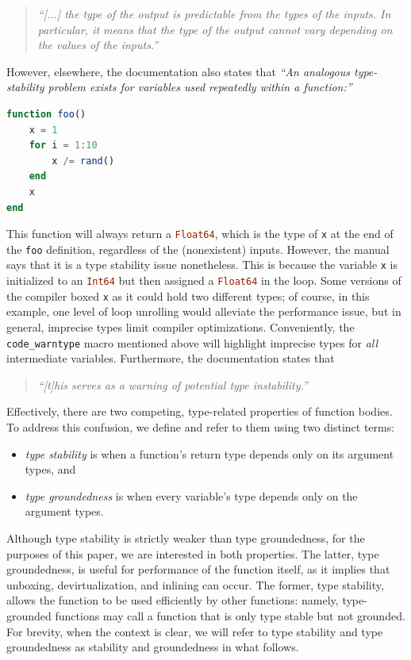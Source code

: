 \documentclass[oneside,openright,titlepage,numbers=noenddot,%
headinclude,footinclude,cleardoublepage=empty,abstract=on,
BCOR=5mm,paper=a4,fontsize=11pt,
dvipsnames
]{scrreprt}
\renewcommand{\c}[1]{\lstinline[language=Julia]!#1!\xspace}
\begin{document}
\begin{quote}
  \itshape``[...] the type of the output is predictable from the types of the
  inputs. In particular, it means that the type of the output cannot vary
  depending on the values of the inputs.''
\end{quote}
However, elsewhere, the documentation also states that \emph{``An analogous
type-stability problem exists for variables used repeatedly within a
function:''}
\begin{lstlisting}[basicstyle=\footnotesize\ttfamily,language=julia]
function foo()
    x = 1
    for i = 1:10
        x /= rand()
    end
    x
end
\end{lstlisting}
This function will always return a \c{Float64}, which is the type of \c{x}
at the end of the \c{foo} definition, regardless of the (nonexistent)
inputs. However, the manual says that it is a type stability issue nonetheless.
This is because the variable \c{x} is initialized to an \c{Int64} but then
assigned a \c{Float64} in the loop. Some versions of the compiler boxed \c{x} as
it could hold two different types; of course, in this example, one level of loop
unrolling would alleviate the performance issue, but in general,
imprecise types limit compiler optimizations.
Conveniently, the \c{code_warntype} macro mentioned above
will highlight imprecise types for \emph{all} intermediate variables.
Furthermore, the documentation states that
\begin{quote}
  \itshape ``[t]his serves as a warning of potential type instability.''
\end{quote}

Effectively, there are two competing, type-related properties
of function bodies. To address this confusion, we
define and refer to them using two distinct terms:
\begin{itemize}
  \item \emph{type stability} is when a function's return type depends only on
    its argument types, and
  \item \emph{type groundedness} is when every variable's type depends
    only on the argument types.
\end{itemize}
Although type stability is strictly weaker than type groundedness,
for the purposes of this paper, we are interested in both properties.
The latter, type groundedness, is useful for performance of the function itself,
as it implies that unboxing, devirtualization, and inlining can occur.
The former, type stability, allows the function to be used efficiently
by other functions: namely, type-grounded functions may call a function that
is only type stable but not grounded.
For brevity, when the context is clear, we will refer to type stability and
type groundedness as stability and groundedness in what follows.
\end{document}
